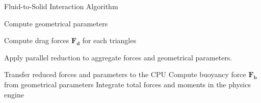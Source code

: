 \begin{algorithm}
\caption{Fluid-to-Solid Interaction Algorithm}
\label{alg:fluid_to_solid}
\begin{algorithmic}[1]
 
     
        \State Compute geometrical parameters 
    \EndFor
\EndFor

 
     
        \State Compute drag forces $\mathbf{F_d}$ for each triangles
    \EndFor
\EndFor

 
     
        \State Apply parallel reduction to aggregate forces and geometrical parameters.
        \EndFor
\EndFor

 
    \State Transfer reduced forces and parameters to the CPU
    \State Compute buoyancy force $\mathbf{F_b}$ from geometrical parameters 
    \State Integrate total forces and moments in the physics engine
\EndFor
\end{algorithmic}
\end{algorithm}
